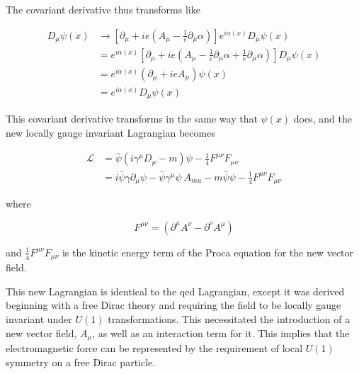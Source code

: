 \noindent The covariant derivative thus transforms like

\begin{equation}\label{eq:u1_covariant_derivative_transformation}
\begin{aligned}
D_{\mu}\psi(x) & \rightarrow [ \partial_{\mu} + ie(A_{\mu} -
\frac{1}{e}\partial_{\mu}\alpha) ]e^{i\alpha(x)}D_{\mu}\psi(x) \\
& = e^{i\alpha(x)}[ \partial_{\mu} + ie(A_{\mu} -
\frac{1}{e}\partial_{\mu}\alpha + \frac{1}{e}\partial_{\mu}\alpha) ]D_{\mu}\psi(x) \\
 & = e^{i\alpha(x)}(\partial_{\mu} + ieA_{\mu})\psi(x) \\
 & = e^{i\alpha(x)}D_{\mu}\psi(x)
\end{aligned}
\end{equation}

\noindent This covariant derivative transforms in the same way that $\psi(x)$
does, and the new locally gauge invariant Lagrangian becomes

\begin{equation}\label{eq:u1_invariant_lagrangian}
\begin{aligned}
\mathcal{L} & = \bar{\psi}(i\gamma^{\mu}D_{\mu} - m)\psi - \frac{1}{4}F^{\mu\nu}F_{\mu\nu} \\
& = i\bar{\psi}\gamma\partial_{\mu}\psi -
\bar{\psi}\gamma^{\mu}\psi~A_{mu} - m\bar{\psi}\psi -
\frac{1}{4}F^{\mu\nu}F_{\mu\nu} 
\end{aligned}
\end{equation}

\noindent where

\begin{equation}\label{eq:u1_field_strength_tensor}
F^{\mu\nu} = (\partial^{\mu}A^{\nu} - \partial^{\nu}A^{\mu})
\end{equation}

\noindent and $\frac{1}{4}F^{\mu\nu}F_{\mu\nu} $ is the kinetic energy
term of the Proca equation for the new vector field.

\par This new Lagrangian is identical to the \acrshort{qed}
Lagrangian, except it was derived beginning with a free Dirac theory
and requiring the field to be locally gauge invariant under $U(1)$
transformations.  This necessitated the introduction of a new vector
field, $A_{\mu}$, as well as an interaction term for it.  This
implies that the electromagnetic force can be represented by the
requirement of local $U(1)$ symmetry on a free Dirac particle.  

